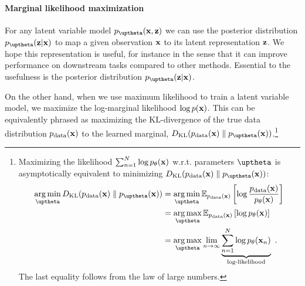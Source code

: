 \paragraph{Marginal likelihood maximization} For any latent variable model $p_{\thetab}(\xb,\zb)$ we can use the posterior distribution $p_{\thetab}(\zb|\xb)$ to map a given observation ${\mathbf{x}}$ to its latent representation ${\mathbf{z}}$. We hope this representation is useful, for instance in the sense that it can improve performance on downstream tasks compared to other methods. Essential to the usefulness is the posterior distribution $p_{\thetab}(\zb|\xb)$. 

On the other hand, when we use maximum likelihood to train a latent variable model, we maximize the log-marginal likelihood $\log p({\mathbf{x}})$. This can be equivalently phrased as maximizing the KL-divergence of the true data distribution $p_{\text{data}}({\mathbf{x}})$ to the learned marginal, $D_{\mathrm{KL}}(p_{\text{data}}(\xb)\parallel p_{\thetab}(\xb))$.\footnote{%
Maximizing the likelihood $\sum_{n=1}^N \log p_\theta({\mathbf{x}})$ w.r.t. parameters $\thetab$ is asymptotically equivalent to minimizing $D_{\mathrm{KL}}(p_{\text{data}}(\xb)\parallel p_{\thetab}(\xb))$: 
%
\begin{align}
    \argmin_\thetab D_{\mathrm{KL}}(p_{\text{data}}(\xb)\parallel p_{\thetab}(\xb)) 
    &= \argmin_\thetab \mathbb{E}_{p_{\text{data}}(\xb)} \left[ \log \frac{p_{\text{data}}(\xb)}{p_{\theta}(\xb)} \right] \nonumber \\
    &= \argmax_\thetab \mathbb{E}_{p_{\text{data}}(\xb)} \left[ \log p_{\theta}(\xb) \right] \nonumber \\
    &= \argmax_\thetab \lim_{n\rightarrow\infty} \underset{\text{log-likelihood}}{\underbrace{\sum_{n=1}^N \log p_{\theta}(\xb_n)}} \enspace . \nonumber
\end{align}
%
The last equality follows from the law of large numbers.
} 
